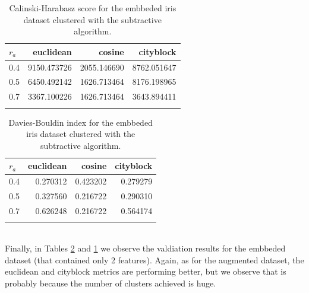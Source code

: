 \documentclass[conference]{IEEEtran}
\begin{document}
\begin{itemize}
    \begin{table}[ht!]
        \centering
        \begin{tabular}{lrrr}
        \toprule
        $r_a$ &    euclidean &       cosine &    cityblock \\
        \midrule
        0.4 &  9150.473726 &  2055.146690 &  8762.051647 \\
        0.5 &  6450.492142 &  1626.713464 &  8176.198965 \\
        0.7 &  3367.100226 &  1626.713464 &  3643.894411 \\
        \bottomrule \\
        \end{tabular}
        \caption{Calinski-Harabasz score for the embbeded iris dataset clustered with the subtractive algorithm.}
        \label{tab:ie_ch}
    \end{table}
    \begin{table}[ht!]
        \centering
        \begin{tabular}{lrrr}
        \toprule
        $r_a$ &  euclidean &    cosine &  cityblock \\
        \midrule
        0.4 &   0.270312 &  0.423202 &   0.279279 \\
        0.5 &   0.327560 &  0.216722 &   0.290310 \\
        0.7 &   0.626248 &  0.216722 &   0.564174 \\
        \bottomrule \\
        \end{tabular}
        \caption{Davies-Bouldin index for the embbeded iris dataset clustered with the subtractive algorithm.}
        \label{tab:ie_db}
    \end{table}
    \ \\
    Finally, in Tables \ref{tab:ie_db} and \ref{tab:ie_ch} we observe the valdiation results for the embbeded dataset (that contained only 2 features). Again, as for the augmented dataset, the euclidean and cityblock metrics are performing better, but we observe that is probably because the number of clusters achieved is huge.
    \begin{figure}[ht]
    \centering

\end{figure}
\end{itemize}
\end{document}

